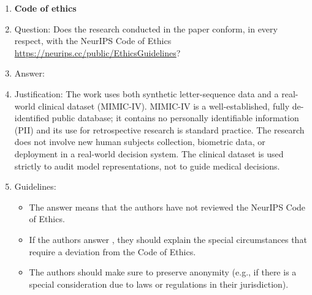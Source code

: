 \documentclass{article}
\theoremstyle{plain}
\theoremstyle{definition}
\theoremstyle{remark}
\begin{document}
\begin{enumerate}
\item {\bf Code of ethics}
    \item[] Question: Does the research conducted in the paper conform, in every respect, with the NeurIPS Code of Ethics \url{https://neurips.cc/public/EthicsGuidelines}?
    \item[] Answer: \answerYes{}
    \item[] Justification: The work uses both synthetic letter-sequence data and a real-world clinical dataset (MIMIC-IV). MIMIC-IV is a well-established, fully de-identified public database; it contains no personally identifiable information (PII) and its use for retrospective research is standard practice. The research does not involve new human subjects collection, biometric data, or deployment in a real-world decision system. The clinical dataset is used strictly to audit model representations, not to guide medical decisions.
    \item[] Guidelines:
    \begin{itemize}
        \item The answer \answerNA{} means that the authors have not reviewed the NeurIPS Code of Ethics.
        \item If the authors answer \answerNo, they should explain the special circumstances that require a deviation from the Code of Ethics.
        \item The authors should make sure to preserve anonymity (e.g., if there is a special consideration due to laws or regulations in their jurisdiction).
    \end{itemize}



\end{enumerate}
\end{document}
